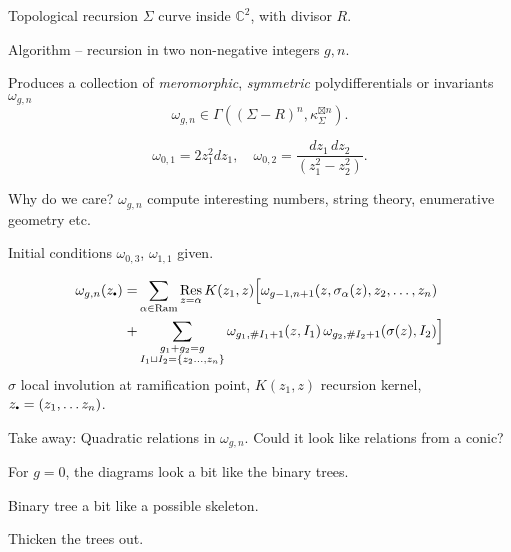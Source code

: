 \frame{\sectionpage}

 
 \begin{frame}{Topological recursion}
    \( \Sigma \) curve  inside \(\mathbb{C}^2\), with divisor \( R \). %
    
    Algorithm -- recursion in two non-negative integers \(g,n\). 

    Produces a collection of \emph{meromorphic}, \emph{symmetric} polydifferentials or invariants \(  \omega_{g,n}\) 
    \[ \omega_{g,n} \in \Gamma(  \left(\Sigma - R \right)^n, \kappa_\Sigma^{\boxtimes n} )   .\] 
    \begin{ex}
    \[ \omega_{0,1} = 2 z_1^2 dz_1 ,\quad  \omega_{0,2} = \frac{dz_1 \, dz_2}{(z_1^2 - z_2^2) }. \]
    \end{ex}
    
    Why do we care? \( \omega_{g,n}\) compute interesting numbers, string theory, enumerative geometry etc.
    \end{frame} 
    
    
    
    \begin{frame} 
    Initial conditions \( \omega_{0,3}\), \(\omega_{1,1}\) given.
    \begin{defn}
    \begin{align*}\omega_{g,n}(z_{\sbt}) =& \sum_{\alpha \in \text{Ram} } \Res_{z = \alpha}  K(z_1, z) \Big[ \omega_{g-1, n+1} (z, \sigma_\alpha(z), z_2, \dots, z_n) \\
    + &\sum_{\substack{g_1 + g_2 = g \\ I_1 \sqcup I_2 = \{z_2\dots,z_n\} }} \omega_{g_1, \# I_1+1}(z,I_1) \, \omega_{g_2, \#I_2  +1}(\sigma(z), I_2) \Big]
    \end{align*}
    \( \sigma \) local involution at ramification point, \( K(z_1,z)\) recursion kernel, \( z_{\sbt} = (z_1, \dots z_n)\).
    \end{defn} 
    Take away: Quadratic relations in \( \omega_{g,n}\). Could it look like relations from a conic?
    \end{frame}
    
    \begin{frame}
        \begin{center}
        
        \end{center}
    \end{frame}
    
        
    \begin{frame}
    For \(g=0\), the diagrams look a bit like the binary trees.
    
    Binary tree a bit like a possible skeleton. 
    
    Thicken the trees out.
    \end{frame}    
        
